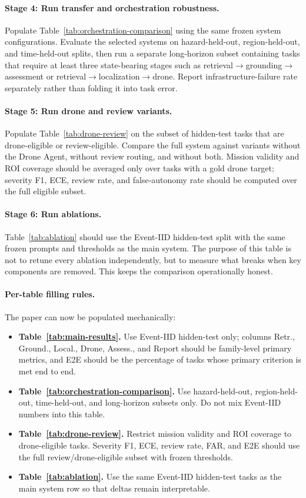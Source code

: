 \documentclass{article}
\begin{document}
\paragraph{Stage 4: Run transfer and orchestration robustness.}
Populate Table~\ref{tab:orchestration-comparison} using the same frozen system configurations. Evaluate the selected systems on hazard-held-out, region-held-out, and time-held-out splits, then run a separate long-horizon subset containing tasks that require at least three state-bearing stages such as retrieval$\rightarrow$grounding$\rightarrow$assessment or retrieval$\rightarrow$localization$\rightarrow$drone. Report infrastructure-failure rate separately rather than folding it into task error.

\paragraph{Stage 5: Run drone and review variants.}
Populate Table~\ref{tab:drone-review} on the subset of hidden-test tasks that are drone-eligible or review-eligible. Compare the full system against variants without the Drone Agent, without review routing, and without both. Mission validity and ROI coverage should be averaged only over tasks with a gold drone target; severity F1, ECE, review rate, and false-autonomy rate should be computed over the full eligible subset.

\paragraph{Stage 6: Run ablations.}
Table~\ref{tab:ablation} should use the Event-IID hidden-test split with the same frozen prompts and thresholds as the main system. The purpose of this table is not to retune every ablation independently, but to measure what breaks when key components are removed. This keeps the comparison operationally honest.

\paragraph{Per-table filling rules.}
The paper can now be populated mechanically:
\begin{itemize}[leftmargin=1.2em]
    \item \textbf{Table~\ref{tab:main-results}.} Use Event-IID hidden-test only; columns Retr., Ground., Local., Drone, Assess., and Report should be family-level primary metrics, and E2E should be the percentage of tasks whose primary criterion is met end to end.
    \item \textbf{Table~\ref{tab:orchestration-comparison}.} Use hazard-held-out, region-held-out, time-held-out, and long-horizon subsets only. Do not mix Event-IID numbers into this table.
    \item \textbf{Table~\ref{tab:drone-review}.} Restrict mission validity and ROI coverage to drone-eligible tasks. Severity F1, ECE, review rate, FAR, and E2E should use the full review/drone-eligible subset with frozen thresholds.
    \item \textbf{Table~\ref{tab:ablation}.} Use the same Event-IID hidden-test tasks as the main system row so that deltas remain interpretable.
\end{itemize}
\end{document}
